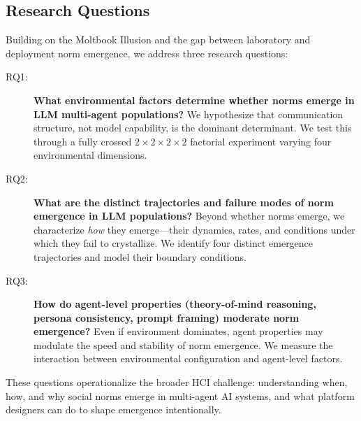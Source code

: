 \subsection{Research Questions}

Building on the Moltbook Illusion and the gap between laboratory and deployment norm emergence, we address three research questions:

\begin{description}
\item[RQ1:] \textbf{What environmental factors determine whether norms emerge in LLM multi-agent populations?} We hypothesize that communication structure, not model capability, is the dominant determinant. We test this through a fully crossed $2\times2\times2\times2$ factorial experiment varying four environmental dimensions.

\item[RQ2:] \textbf{What are the distinct trajectories and failure modes of norm emergence in LLM populations?} Beyond whether norms emerge, we characterize \emph{how} they emerge—their dynamics, rates, and conditions under which they fail to crystallize. We identify four distinct emergence trajectories and model their boundary conditions.

\item[RQ3:] \textbf{How do agent-level properties (theory-of-mind reasoning, persona consistency, prompt framing) moderate norm emergence?} Even if environment dominates, agent properties may modulate the speed and stability of norm emergence. We measure the interaction between environmental configuration and agent-level factors.
\end{description}

These questions operationalize the broader HCI challenge: understanding when, how, and why social norms emerge in multi-agent AI systems, and what platform designers can do to shape emergence intentionally.